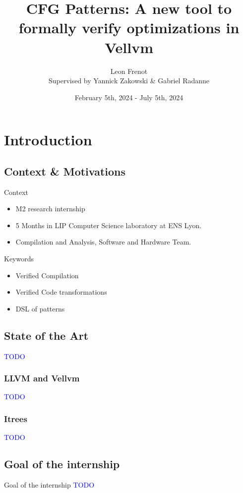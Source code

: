 \documentclass{beamer}
\title{CFG Patterns: A new tool to formally verify optimizations in Vellvm}
\author[Léon Frenot]{Leon Frenot\\ Supervised by Yannick Zakowski \& Gabriel Radanne}
\date[July 12th, 2024]{February 5th, 2024 - July 5th, 2024}
\newcommand{\leon}[1]{\textcolor{blue}{#1}}
\begin{document}
\frame{\titlepage}

\section*{Introduction}

\subsection*{Context \& Motivations}

\begin{frame}
  Context
  \begin{itemize}
    \item M2 research internship
    \item 5 Months in LIP Computer Science laboratory at ENS Lyon.
    \item Compilation and Analysis, Software and Hardware Team.
  \end{itemize}
  Keywords
  \begin{itemize}
    \item Verified Compilation
    \item Verified Code transformations
    \item DSL of patterns
  \end{itemize}
\end{frame}

\subsection*{State of the Art}
\begin{frame}
  \leon{TODO}
\end{frame}

\begin{frame}
  \frametitle{LLVM and Vellvm}
  \leon{TODO}
\end{frame}

\begin{frame}
  \frametitle{Itrees}
  \leon{TODO}
\end{frame}

\subsection*{Goal of the internship}

\begin{frame}
  \begin{block}{Goal of the internship}
    \leon{TODO}
  \end{block}
\end{frame}
\end{document}
